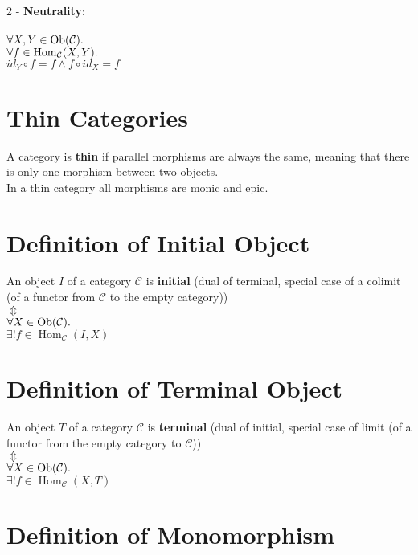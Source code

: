 \documentclass[a4paper, twoside, english, 11pt]{book}
\DeclareMathOperator{\Hom}{Hom}
\DeclareMathOperator{\Ob}{Ob}
\newcommand{\C}{\mathcal C}
\begin{document}
2 - \textbf{Neutrality}: \\\\
\indent\indent
$\forall X, Y \in \Ob(\C) \ldotp$ \\
\indent\indent
$\forall f \in \Hom_\C(X, Y) \ldotp$ \\
\indent\indent
$id_Y \circ f = f \land f \circ id_X = f$ \\



\section{Thin Categories}

A category is \textbf{thin} if parallel morphisms are always the same, meaning that there is only one morphism between two objects. \\

\noindent
In a thin category all morphisms are monic and epic.



\section{Definition of Initial Object}

An object $I$ of a category $\C$ is \textbf{initial} (dual of terminal, special case of a colimit (of a functor from $\C$ to the empty category)) \\
\indent
$\Updownarrow$ \\ %
$\forall X \in \Ob(\C) \ldotp$ \\
$\exists! f \in \Hom_\C(I, X)$



\section{Definition of Terminal Object}

An object $T$ of a category $\C$ is \textbf{terminal} (dual of initial, special case of limit (of a functor from the empty category to $\C$)) \\
\indent
$\Updownarrow$ \\ %
$\forall X \in \Ob(\C) \ldotp$ \\
$\exists! f \in \Hom_\C(X, T)$



\section{Definition of Monomorphism}
\end{document}
